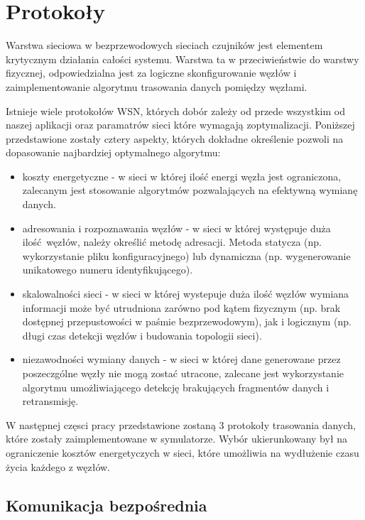 \documentclass[a4paper,12pt,twoside,openany]{report}
\begin{document}
\section{Protokoły}

Warstwa sieciowa w bezprzewodowych sieciach czujników jest elementem krytycznym działania całości systemu.
Warstwa ta w przeciwieństwie do warstwy fizycznej, odpowiedzialna jest za logiczne skonfigurowanie węzłów i
zaimplementowanie algorytmu trasowania danych pomiędzy węzłami.

Istnieje wiele protokołów WSN, których dobór zależy od przede wszystkim od naszej aplikacji oraz
paramatrów sieci które wymagają zoptymalizacji. Poniższej przedstawione zostały cztery aspekty, których dokładne określenie pozwoli
na dopasowanie najbardziej optymalnego algorytmu:

\begin{itemize}
 \item koszty energetyczne - w sieci w której ilość energi węzła jest ograniczona, zalecanym jest stosowanie algorytmów pozwalających
       na efektywną wymianę danych.
 \item adresowania i rozpoznawania węzłów - w sieci w której występuje duża ilość węzłów, należy określić metodę adresacji.
       Metoda statycza (np. wykorzystanie pliku konfiguracyjnego) lub dynamiczna (np. wygenerowanie unikatowego numeru identyfikującego).
 \item skalowalności sieci - w sieci w której wystepuje duża ilość węzłów wymiana informacji może być utrudniona zarówno pod kątem fizycznym
       (np. brak dostępnej przepustowości w paśmie bezprzewodowym), jak i logicznym (np. długi czas detekcji węzłów i budowania topologii sieci).
 \item niezawodności wymiany danych - w sieci w której dane generowane przez poszeczgólne węzły nie mogą zostać utracone, zalecane jest wykorzystanie
       algorytmu umożliwiającego detekcję brakujących fragmentów danych i retransmisję.
\end{itemize}

W następnej częsci pracy przedstawione zostaną 3 protokoły trasowania danych, które zostały zaimplementowane w symulatorze.
Wybór ukierunkowany był na ograniczenie kosztów energetyczych w sieci, które umożliwia na wydłużenie czasu życia każdego z węzłów.

\subsection{Komunikacja bezpośrednia}
\end{document}
